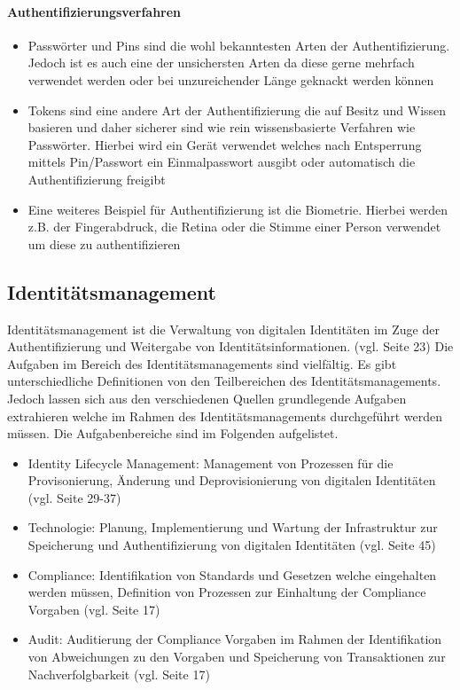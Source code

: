 \documentclass[11pt]{article}
\begin{document}
\paragraph{Authentifizierungsverfahren}
\begin{itemize}
  \item Passwörter und Pins sind die wohl bekanntesten Arten der Authentifizierung. Jedoch ist es auch eine der unsichersten Arten da diese gerne mehrfach verwendet werden oder bei unzureichender Länge geknackt werden können
  \item Tokens sind eine andere Art der Authentifizierung die auf Besitz und Wissen basieren und daher sicherer sind wie rein wissensbasierte Verfahren wie Passwörter. Hierbei wird ein Gerät verwendet welches nach Entsperrung mittels Pin/Passwort ein Einmalpasswort ausgibt oder automatisch die Authentifizierung freigibt
  \item Eine weiteres Beispiel für Authentifizierung ist die Biometrie. Hierbei werden z.B. der Fingerabdruck, die Retina oder die Stimme einer Person verwendet um diese zu authentifizieren
\end{itemize}
\subsection{Identitätsmanagement}
Identitätsmanagement ist die Verwaltung von digitalen Identitäten im Zuge der Authentifizierung und Weitergabe von Identitätsinformationen. (vgl. \cite{bertino2010identity} Seite 23) Die Aufgaben im Bereich des Identitätsmanagements sind vielfältig. Es gibt unterschiedliche Definitionen von den Teilbereichen des Identitätsmanagements. Jedoch lassen sich aus den verschiedenen Quellen grundlegende Aufgaben extrahieren welche im Rahmen des Identitätsmanagements durchgeführt werden müssen. Die Aufgabenbereiche sind im Folgenden aufgelistet.
\begin{itemize}
  \item Identity Lifecycle Management: Management von Prozessen für die Provisonierung, Änderung und Deprovisionierung von digitalen Identitäten (vgl. \cite{bertino2010identity} Seite 29-37)
  \item Technologie: Planung, Implementierung und Wartung der Infrastruktur zur Speicherung und Authentifizierung von digitalen Identitäten (vgl. \cite{bertino2010identity} Seite 45)
  \item Compliance: Identifikation von Standards und Gesetzen welche eingehalten werden müssen, Definition von Prozessen zur Einhaltung der Compliance Vorgaben (vgl. \cite{bertino2010identity} Seite 17)
  \item Audit: Auditierung der Compliance Vorgaben im Rahmen der Identifikation von Abweichungen zu den Vorgaben und Speicherung von Transaktionen zur Nachverfolgbarkeit (vgl. \cite{bertino2010identity} Seite 17)
\end{itemize}
\end{document}
